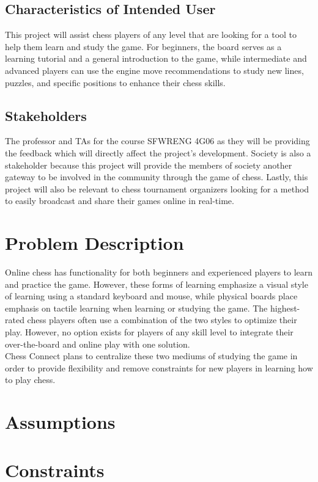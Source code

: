 \documentclass[12pt]{article}
\begin{document}
\subsection{Characteristics of Intended User}
{This project will assist chess players of any level that are looking for a tool to help them learn and study the game. For beginners, 
the board serves as a learning tutorial and a general introduction to the game, while intermediate and advanced players can use the 
engine move recommendations to study new lines, puzzles, and specific positions to enhance their chess skills.}

\subsection{Stakeholders}
{The professor and TAs for the course SFWRENG 4G06 as they will be providing the feedback which will directly affect the project’s development. 
Society is also a stakeholder because this project will provide the members of society another gateway to be involved in the community through the game of chess. Lastly, this project will 
also be relevant to chess tournament organizers looking for a method to easily broadcast and share their games online in real-time.}

\section{Problem Description}

{Online chess has functionality for both beginners and experienced players to
learn and practice the game. However, these forms of learning emphasize a
visual style of learning using a standard keyboard and mouse, while physical
boards place emphasis on tactile learning when learning or studying the game.
The highest-rated chess players often use a combination of the two styles to
optimize their play. However, no option exists for players of any skill level to
integrate their over-the-board and online play with one solution.\\
Chess Connect plans to centralize these two mediums of studying the game in
order to provide flexibility and remove constraints for new players in learning
how to play chess.}


\section{Assumptions}

\section{Constraints}
\end{document}
